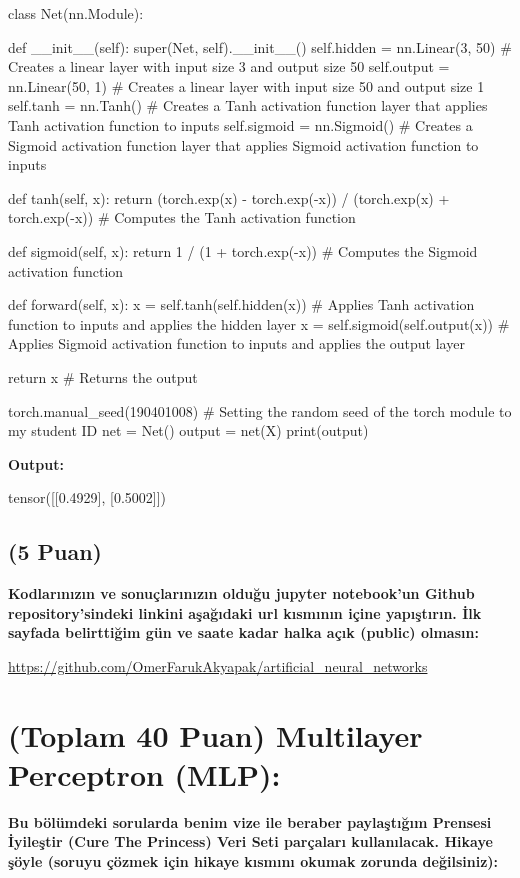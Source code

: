 \documentclass[11pt]{article}
\begin{document}
\begin{python}
class Net(nn.Module):

    def __init__(self):
        super(Net, self).__init__()
        self.hidden = nn.Linear(3, 50)  # Creates a linear layer with input size 3 and output size 50
        self.output = nn.Linear(50, 1)  # Creates a linear layer with input size 50 and output size 1
        self.tanh = nn.Tanh()  # Creates a Tanh activation function layer that applies Tanh activation function to inputs
        self.sigmoid = nn.Sigmoid()  # Creates a Sigmoid activation function layer that applies Sigmoid activation function to inputs

    def tanh(self, x):
        return (torch.exp(x) - torch.exp(-x)) / (torch.exp(x) + torch.exp(-x))  # Computes the Tanh activation function

    def sigmoid(self, x):
        return 1 / (1 + torch.exp(-x))  # Computes the Sigmoid activation function

    def forward(self, x):
        x = self.tanh(self.hidden(x))  # Applies Tanh activation function to inputs and applies the hidden layer
        x = self.sigmoid(self.output(x))  # Applies Sigmoid activation function to inputs and applies the output layer

        return x  # Returns the output

torch.manual_seed(190401008)  # Setting the random seed of the torch module to my student ID
net = Net()
output = net(X)
print(output)
\end{python}

\textbf{Output:} 

tensor([[0.4929],
        [0.5002]])

\subsection{(5 Puan)} \textbf{Kodlarınızın ve sonuçlarınızın olduğu jupyter notebook'un Github repository'sindeki linkini aşağıdaki url kısmının içine yapıştırın. İlk sayfada belirttiğim gün ve saate kadar halka açık (public) olmasın:}

\url{https://github.com/OmerFarukAkyapak/artificial_neural_networks}

\section{(Toplam 40 Puan) Multilayer Perceptron (MLP):} 
\textbf{Bu bölümdeki sorularda benim vize ile beraber paylaştığım Prensesi İyileştir (Cure The Princess) Veri Seti parçaları kullanılacak. Hikaye şöyle (soruyu çözmek için hikaye kısmını okumak zorunda değilsiniz):} 
\end{document}
